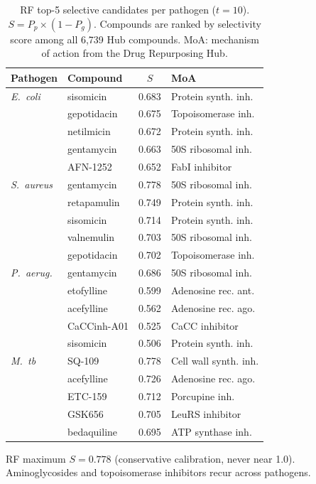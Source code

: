 \documentclass{article}
\begin{document}
\begin{table}[ht]
\caption{RF top-5 selective candidates per pathogen ($t{=}10$). $S = P_p \times (1 - P_g)$. Compounds are ranked by selectivity score among all 6,739 Hub compounds. MoA: mechanism of action from the Drug Repurposing Hub.}
\label{tab:rf_top5}
\centering
\scriptsize
\begin{tabular}{llcl}
\toprule
\textbf{Pathogen} & \textbf{Compound} & $S$ & \textbf{MoA} \\
\midrule
\textit{E.~coli} & sisomicin & 0.683 & Protein synth. inh. \\
& gepotidacin & 0.675 & Topoisomerase inh. \\
& netilmicin & 0.672 & Protein synth. inh. \\
& gentamycin & 0.663 & 50S ribosomal inh. \\
& AFN-1252 & 0.652 & FabI inhibitor \\
\midrule
\textit{S.~aureus} & gentamycin & 0.778 & 50S ribosomal inh. \\
& retapamulin & 0.749 & Protein synth. inh. \\
& sisomicin & 0.714 & Protein synth. inh. \\
& valnemulin & 0.703 & 50S ribosomal inh. \\
& gepotidacin & 0.702 & Topoisomerase inh. \\
\midrule
\textit{P.~aerug.} & gentamycin & 0.686 & 50S ribosomal inh. \\
& etofylline & 0.599 & Adenosine rec. ant. \\
& acefylline & 0.562 & Adenosine rec. ago. \\
& CaCCinh-A01 & 0.525 & CaCC inhibitor \\
& sisomicin & 0.506 & Protein synth. inh. \\
\midrule
\textit{M.~tb} & SQ-109 & 0.778 & Cell wall synth. inh. \\
& acefylline & 0.726 & Adenosine rec. ago. \\
& ETC-159 & 0.712 & Porcupine inh. \\
& GSK656 & 0.705 & LeuRS inhibitor \\
& bedaquiline & 0.695 & ATP synthase inh. \\
\bottomrule
\end{tabular}
\end{table}

RF maximum $S = 0.778$ (conservative calibration, never near 1.0).
Aminoglycosides and topoisomerase inhibitors recur across pathogens.
\end{document}
